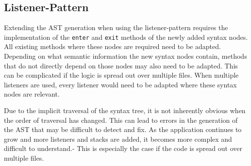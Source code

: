 \subsection{Listener-Pattern}

Extending the AST generation when using the listener-pattern requires the implementation of the \verb|enter| and \verb|exit| methods of the newly added syntax nodes. All existing methods where these nodes are required need to be adapted. Depending on what semantic information the new syntax nodes contain, methods that do not directly depend on those nodes may also need to be adapted. This can be complicated if the logic is spread out over multiple files. When multiple listeners are used, every listener would need to be adapted where these syntax nodes are relevant. 

Due to the implicit traversal of the syntax tree, it is not inherently obvious when the order of traversal has changed. This can lead to errors in the generation of the AST that may be difficult to detect and fix. As the application continues to grow and more listeners and stacks are added, it becomes more complex and difficult to understand.- This is especially the case if the code is spread out over multiple files.  
